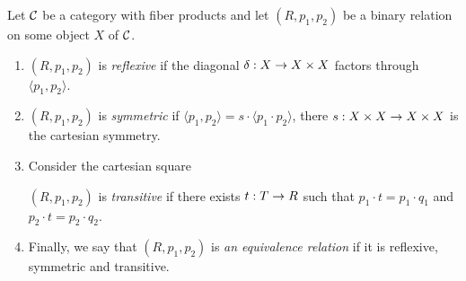 \begin{definition}
Let ${\mathcal C}$ be a category with fiber products and let $(R,p_1,p_2)$ be a binary relation on some object $X$ of ${\mathcal C}$.
\begin{enumerate}[label=\textbf{(\arabic*)}, leftmargin=1.5em]
\item $(R,p_1,p_2)$ is \textit{reflexive} if the diagonal $\delta:X \rightarrow X\times X$ factors through $\langle p_1,p_2\rangle$.
\item $(R,p_1,p_2)$ is \textit{symmetric} if $\langle p_1,p_2\rangle = s\cdot \langle p_1\cdot p_2\rangle$, there $s:X\times X\rightarrow X\times X$ is the cartesian symmetry. 
\item Consider the cartesian square
\begin{center}
\end{center}
$(R,p_1,p_2)$ is \textit{transitive} if there exists $t:T\rightarrow R$ such that $p_1\cdot t = p_1\cdot q_1$ and $p_2\cdot t = p_2\cdot q_2$.
\item Finally, we say that $(R,p_1,p_2)$ is \textit{an equivalence relation} if it is reflexive, symmetric and transitive. 
\end{enumerate}
\end{definition}

